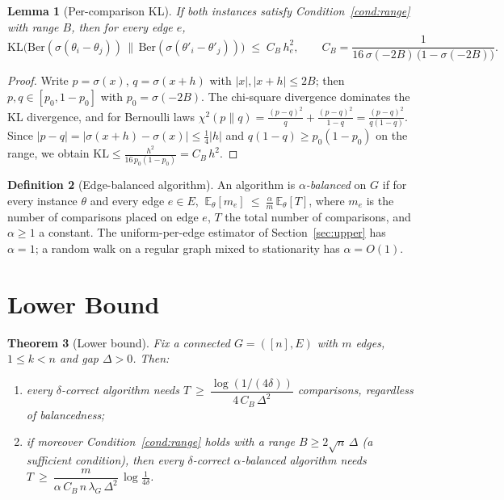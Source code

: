 \documentclass[11pt]{article}
\newtheorem{theorem}{Theorem}[section]
\newtheorem{lemma}[theorem]{Lemma}
\theoremstyle{definition}
\newtheorem{definition}[theorem]{Definition}
\newcommand{\E}{\mathbb{E}}
\newcommand{\KL}{\mathrm{KL}}
\newcommand{\lG}{\lambda_G}
\begin{document}
\begin{lemma}[Per-comparison KL]
\label{lem:kl}
If both instances satisfy Condition~\ref{cond:range} with range $B$, then for every edge $e$,
\[
\KL\!\big(\mathrm{Ber}(\sigma(\theta_i-\theta_j))\,\big\|\,\mathrm{Ber}(\sigma(\theta'_i-\theta'_j))\big)\;\le\; C_B\, h_e^2,
\qquad
C_B=\frac{1}{16\,\sigma(-2B)\,\big(1-\sigma(-2B)\big)} .
\]
\end{lemma}
\begin{proof}
Write $p=\sigma(x)$, $q=\sigma(x+h)$ with $|x|,|x+h|\le 2B$; then $p,q\in[p_0,1-p_0]$ with $p_0=\sigma(-2B)$.  The chi-square divergence dominates the KL divergence, and for Bernoulli laws
$\chi^2(p\|q)=\frac{(p-q)^2}{q}+\frac{(p-q)^2}{1-q}=\frac{(p-q)^2}{q(1-q)}$.
Since $|p-q|=|\sigma(x+h)-\sigma(x)|\le\tfrac14|h|$ and $q(1-q)\ge p_0(1-p_0)$ on the range, we obtain
$\KL\le\frac{h^2}{16\,p_0(1-p_0)}=C_B\,h^2$.
\end{proof}

\begin{definition}[Edge-balanced algorithm]
\label{def:balanced}
An algorithm is \emph{$\alpha$-balanced} on $G$ if for every instance $\theta$ and every edge $e\in E$,
$\ \E_\theta[m_e]\ \le\ \frac{\alpha}{m}\,\E_\theta[T]$,
where $m_e$ is the number of comparisons placed on edge $e$, $T$ the total number of comparisons, and $\alpha\ge 1$ a constant.  The uniform-per-edge estimator of Section~\ref{sec:upper} has $\alpha=1$; a random walk on a regular graph mixed to stationarity has $\alpha=O(1)$.
\end{definition}


\section{Lower Bound}
\label{sec:lower}

\begin{theorem}[Lower bound]
\label{thm:lower}
Fix a connected $G=([n],E)$ with $m$ edges, $1\le k<n$ and gap $\Delta>0$.  Then:
\begin{enumerate}
\item[(a)] every $\delta$-correct algorithm needs
$T\ \ge\ \dfrac{\log(1/(4\delta))}{4\,C_B\,\Delta^2}$
comparisons, regardless of balancedness;
\item[(b)] if moreover Condition~\ref{cond:range} holds with a range $B\ge 2\sqrt n\,\Delta$ (a sufficient condition), then every $\delta$-correct \emph{$\alpha$-balanced} algorithm needs
$T\ \ge\ \dfrac{m}{\alpha\,C_B\,n\,\lG\,\Delta^2}\,\log\!\frac{1}{4\delta}$.
\end{enumerate}
\end{theorem}
\end{document}
